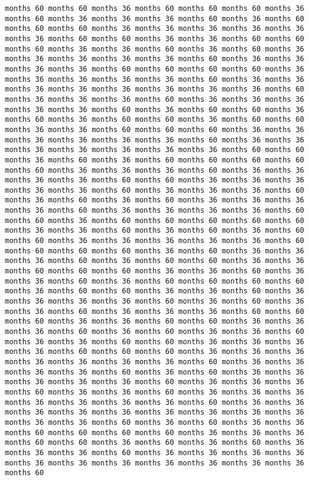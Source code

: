 \documentclass[11pt]{article}
\begin{document}
\begin{Verbatim}[commandchars=\\\{\}, frame=single, framerule=2mm, rulecolor=\color{outerrorbackground}]
months 60 months 60 months 36 months 60 months 60 months 60 months 36 months 60 months 36 months 36 months 36 months 60 months 36 months 60 months 60 months 60 months 36 months 36 months 36 months 36 months 36 months 36 months 60 months 60 months 36 months 36 months 60 months 60 months 60 months 36 months 36 months 60 months 36 months 60 months 36 months 36 months 36 months 36 months 36 months 60 months 36 months 36 months 36 months 36 months 60 months 60 months 60 months 60 months 36 months 36 months 36 months 36 months 36 months 60 months 36 months 36 months 36 months 36 months 36 months 36 months 36 months 36 months 60 months 36 months 36 months 36 months 60 months 36 months 36 months 36 months 36 months 36 months 60 months 36 months 60 months 60 months 36 months 60 months 36 months 60 months 60 months 36 months 60 months 60 months 36 months 36 months 60 months 60 months 60 months 36 months 36 months 36 months 36 months 36 months 36 months 60 months 36 months 36 months 36 months 36 months 36 months 36 months 36 months 60 months 60 months 36 months 60 months 36 months 60 months 60 months 60 months 60 months 60 months 36 months 36 months 36 months 60 months 36 months 36 months 36 months 36 months 60 months 60 months 36 months 36 months 36 months 36 months 36 months 60 months 36 months 36 months 36 months 60 months 36 months 60 months 36 months 60 months 36 months 36 months 36 months 36 months 60 months 36 months 36 months 36 months 36 months 60 months 60 months 36 months 60 months 60 months 60 months 60 months 60 months 36 months 36 months 60 months 36 months 60 months 36 months 60 months 60 months 36 months 36 months 36 months 36 months 36 months 60 months 60 months 60 months 60 months 36 months 60 months 36 months 36 months 36 months 60 months 36 months 60 months 60 months 36 months 36 months 60 months 60 months 60 months 36 months 36 months 60 months 36 months 36 months 60 months 36 months 60 months 60 months 60 months 60 months 36 months 60 months 60 months 36 months 36 months 60 months 36 months 36 months 36 months 36 months 60 months 36 months 60 months 36 months 36 months 60 months 36 months 36 months 36 months 60 months 60 months 60 months 36 months 36 months 60 months 60 months 36 months 36 months 36 months 60 months 36 months 60 months 36 months 36 months 60 months 36 months 36 months 60 months 60 months 36 months 36 months 36 months 36 months 60 months 60 months 60 months 36 months 36 months 36 months 36 months 36 months 36 months 36 months 60 months 36 months 36 months 36 months 36 months 60 months 36 months 60 months 36 months 36 months 36 months 36 months 36 months 60 months 36 months 36 months 36 months 60 months 36 months 36 months 60 months 36 months 36 months 36 months 36 months 36 months 36 months 36 months 60 months 36 months 36 months 36 months 36 months 36 months 36 months 36 months 36 months 36 months 36 months 36 months 60 months 36 months 60 months 36 months 36 months 60 months 60 months 60 months 60 months 36 months 36 months 36 months 60 months 60 months 36 months 60 months 36 months 60 months 36 months 36 months 36 months 60 months 36 months 36 months 36 months 36 months 36 months 36 months 36 months 36 months 36 months 36 months 36 months 60 
\end{Verbatim}
\end{document}
